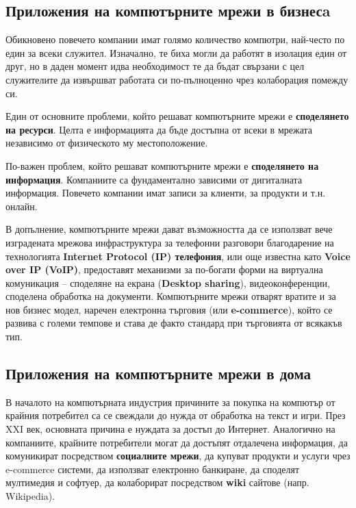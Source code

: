 \documentclass[12pt,a4paper,oneside]{book}
\begin{document}
\subsection{Приложения на компютърните мрежи в бизнесa}

Обикновено повечето компании имат голямо количество компютри, най-често по един
за всеки служител. Изначално, те биха могли да работят в изолация един от друг,
но в даден момент идва необходимост те да бъдат свързани с цел служителите да
извършват работата си по-пълноценно чрез колаборация помежду си.

Един от основните проблеми, който решават компютърните мрежи е
\textbf{споделянето на ресурси}. Целта е информацията да бъде достъпна от всеки
в мрежата независимо от физическото му местоположение.

По-важен проблем, който решават компютърните мрежи е \textbf{споделянето на
информация}. Компаниите са фундаментално зависими от дигиталната
информация. Повечето компании имат записи за клиенти, за продукти и т.н. онлайн.

В допълнение, компютърните мрежи дават възможността да се използват вече
изградената мрежова инфраструктура за телефонни разговори благодарение на 
технологията \textbf{Internet Protocol (IP) телефония}, или още известна като
\textbf{Voice over IP (VoIP)}, предоставят механизми за по-богати
форми на виртуална комуникация -- споделяне на екрана
(\textbf{Desktop sharing}), видеоконференции, споделена обработка на документи.
Компютърните мрежи отварят вратите и за нов бизнес модел, наречен електронна
търговия (или \textbf{e-commerce}), който се развива с големи темпове и става де
факто стандард при търговията от всякакъв тип.  \cite{tanenbaum_computer_2011}

\subsection{Приложения на компютърните мрежи в дома}

В началото на компютърната индустрия причините за покупка на компютър от крайния
потребител са се свеждали до нужда от обработка на текст и игри. През XXI век,
основната причина е нуждата за достъп до
Интернет. Аналогично на компаниите, крайните потребители могат да достъпят
отдалечена информация, да комуникират посредством \textbf{социалните мрежи},
да купуват продукти и услуги чрез e-commerce системи, да използват електронно
банкиране, да споделят мултимедия и софтуер, да колаборират посредством
\textbf{wiki} сайтове (напр. Wikipedia).
\end{document}
